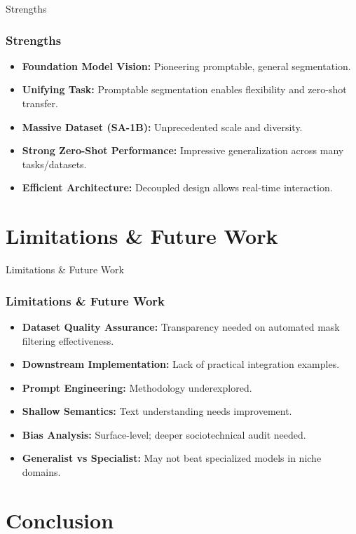 \documentclass{beamer}
\begin{document}
\begin{frame}{Strengths}
    \frametitle{Strengths}
    \begin{itemize}
        \item \textbf{Foundation Model Vision:} Pioneering promptable, general segmentation.
        \item \textbf{Unifying Task:} Promptable segmentation enables flexibility and zero-shot transfer.
        \item \textbf{Massive Dataset (SA-1B):} Unprecedented scale and diversity.
        \item \textbf{Strong Zero-Shot Performance:} Impressive generalization across many tasks/datasets.
        \item \textbf{Efficient Architecture:} Decoupled design allows real-time interaction.
    \end{itemize}
\end{frame}

\section{Limitations \& Future Work}

\begin{frame}{Limitations \& Future Work}
    \frametitle{Limitations \& Future Work}
    \begin{itemize}
        \item \textbf{Dataset Quality Assurance:} Transparency needed on automated mask filtering effectiveness.
        \item \textbf{Downstream Implementation:} Lack of practical integration examples.
        \item \textbf{Prompt Engineering:} Methodology underexplored.
        \item \textbf{Shallow Semantics:} Text understanding needs improvement.
        \item \textbf{Bias Analysis:} Surface-level; deeper sociotechnical audit needed.
        \item \textbf{Generalist vs Specialist:} May not beat specialized models in niche domains.
    \end{itemize}
\end{frame}

\section{Conclusion}
\end{document}
